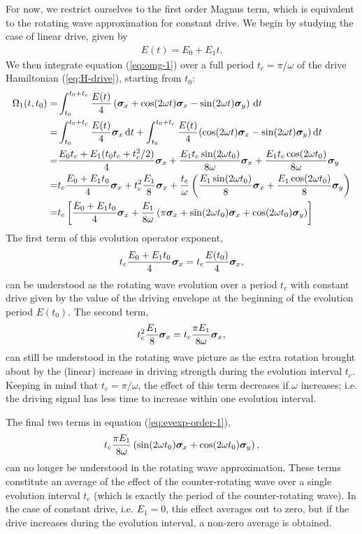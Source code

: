 For now, we restrict ourselves to the first order Magnus term, which is equivalent to the rotating wave approximation for constant drive. We begin by studying the case of linear drive, given by
\begin{align}
	E(t) = E_0 + E_1 t.
\end{align}
We then integrate equation (\ref{eq:omg-1}) over a full period $t_c = \pi / \omega$ of the drive Hamiltonian (\ref{eq:H-drive}), starting from $t_0$:
\begin{align}
	\Omega_1(t,t_0) = &\int_{t_0}^{t_0+t_c} \frac{E(t)}{4}\left( \bm{\sigma}_x + \cos(2 \omega t) \bm{\sigma}_x - \sin(2 \omega t) \bm{\sigma}_y \right) \, \mathrm{d}t \nonumber \\
	= &\int_{t_0}^{t_0+t_c} \frac{E(t)}{4} \bm{\sigma}_x \, \mathrm{d}t + \int_{t_0}^{t_0+t_c} \frac{E(t)}{4} (\cos(2 \omega t) \bm{\sigma}_x - \sin(2 \omega t) \bm{\sigma}_y) \, \mathrm{d}t \nonumber \\
	= &\frac{E_0 t_c  + E_1 (t_0 t_c + t_c^2 / 2)}{4} \bm{\sigma}_x + \frac{E_1 t_c \sin(2 \omega t_0)}{8\omega} \bm{\sigma}_x + \frac{E_1 t_c \cos(2 \omega t_0)}{8\omega} \bm{\sigma}_y \nonumber \\
	= &t_c\frac{E_0 + E_1 t_0}{4} \bm{\sigma}_x + t_c^2 \frac{E_1}{8} \bm{\sigma}_x + \frac{t_c}{\omega} \left( \frac{E_1 \sin(2 \omega t_0)}{8} \bm{\sigma}_x + \frac{E_1 \cos(2 \omega t_0)}{8} \bm{\sigma}_y \right) \nonumber \\
	= &t_c\left[ \frac{E_0 + E_1 t_0}{4} \bm{\sigma}_x + \frac{E_1}{8 \omega} \left( \pi \bm{\sigma}_x + \sin(2 \omega t_0) \bm{\sigma}_x + \cos(2 \omega t_0) \bm{\sigma}_y \right) \right] \label{eq:evexp-order-1}
\end{align}
The first term of this evolution operator exponent,
\begin{align}
	\label{eq:evexp-rwa-constant-term}
	t_c \frac{E_0 + E_1 t_0}{4} \bm{\sigma}_x = t_c \frac{E(t_0)}{4} \bm{\sigma}_x,
\end{align}
can be understood as the rotating wave evolution over a period $t_c$ with constant drive given by the value of the driving envelope at the beginning of the evolution period $E(t_0)$. The second term,
\begin{align}
	\label{eq:evexp-rwa-linear-term}
	t_c^2\frac{E_1}{8}\bm{\sigma}_x=t_c\frac{\pi E_1}{8 \omega}\bm{\sigma}_x,
\end{align}
can still be understood in the rotating wave picture as the extra rotation brought about by the (linear) increase in driving strength during the evolution interval $t_c$. Keeping in mind that $t_c = \pi / \omega$, the effect of this term decreases if $\omega$ increases; i.e. the driving signal has less time to increase within one evolution interval. 

The final two terms in equation (\ref{eq:evexp-order-1}),
\begin{align}
	t_c \frac{\pi E_1}{8 \omega} \left( \sin(2 \omega t_0) \bm{\sigma}_x + \cos(2 \omega t_0) \bm{\sigma}_y \right),
\end{align}
can no longer be understood in the rotating wave approximation. These terms constitute an average of the effect of the counter-rotating wave over a single evolution interval $t_c$ (which is exactly the period of the counter-rotating wave). In the case of constant drive, i.e. $E_1 = 0$, this effect averages out to zero, but if the drive increases during the evolution interval, a non-zero average is obtained.

\printbibliography
	
